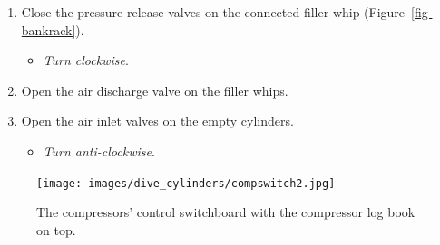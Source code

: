 \documentclass[
  12pt,
]{report}
\providecommand{\tightlist}{%
  \setlength{\itemsep}{0pt}\setlength{\parskip}{0pt}}\usepackage{longtable,booktabs,array}
\begin{document}
\begin{enumerate}
\def\labelenumi{\arabic{enumi}.}
\setcounter{enumi}{3}
\tightlist
\item
  Close the pressure release valves on the connected filler whip
  (Figure~\ref{fig-bankrack}).

  \begin{itemize}
  \tightlist
  \item
    \emph{Turn clockwise}.
  \end{itemize}
\item
  Open the air discharge valve on the filler whips.
\item
  Open the air inlet valves on the empty cylinders.

  \begin{itemize}
  \tightlist
  \item
    \emph{Turn anti-clockwise}.
  \end{itemize}
\end{enumerate}

\begin{figure}[H]

{\centering \texttt{[image: images/dive\_cylinders/compswitch2.jpg]}

}

\caption{\label{fig-compswitch}The compressors' control switchboard with
the compressor log book on top.}

\end{figure}
\end{document}
